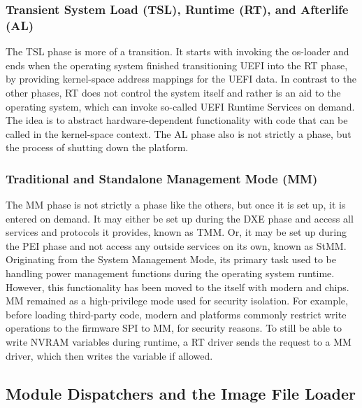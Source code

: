 \subsubsection{Transient System Load (TSL), Runtime (RT), and Afterlife (AL)}

The \gls{TSL} phase is more of a transition. It starts with invoking the \gls{os-loader} and ends when the operating system finished transitioning \gls{UEFI} into the \gls{RT} phase, by providing \gls{kernel-space} address mappings for the \gls{UEFI}  data. In contrast to the other phases, \gls{RT} does not control the system itself and rather is an aid to the operating system, which can invoke so-called \gls{UEFI} Runtime Services on demand. The idea is to abstract hardware-dependent functionality with  code that can be called in the \gls{kernel-space} context. The \gls{AL} phase also is not strictly a phase, but the process of shutting down the platform.

\subsubsection{Traditional and Standalone Management Mode (MM)}

The \gls{MM} phase is not strictly a phase like the others, but once it is set up, it is entered on demand. It may either be set up during the \gls{DXE} phase and access all services and protocols it provides, known as \gls{TMM}. Or, it may be set up during the \gls{PEI} phase and not access any outside services on its own, known as \gls{StMM}. Originating from the  System Management Mode, its primary task used to be handling power management functions during the operating system runtime. However, this functionality has been moved to the  itself with modern  and  chips. \gls{MM} remained as a high-privilege mode used for security isolation. For example, before loading third-party code, modern  and  platforms commonly restrict write operations to the firmware \gls{SPI} to \gls{MM}, for security reasons. To still be able to write \gls{NVRAM} variables during runtime, a \gls{RT} driver sends the request to a \gls{MM} driver, which then writes the variable if allowed.


\subsection{Module Dispatchers and the Image File Loader}

